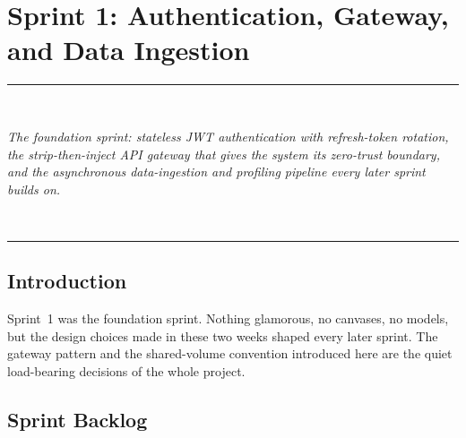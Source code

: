 \documentclass[12pt, a4paper, oneside]{report}
\newcommand{\chapterabstract}[1]{%
  \vspace*{1.2cm}%
  \begin{center}%
  \rule{0.45\textwidth}{0.4pt}\\[0.8em]%
  \begin{minipage}{0.82\textwidth}\centering\itshape\large #1\end{minipage}\\[0.8em]%
  \rule{0.45\textwidth}{0.4pt}%
  \end{center}%
  \vspace*{\fill}\clearpage}
\begin{document}
\chapter{Sprint 1: Authentication, Gateway, and Data Ingestion}
\chapterabstract{The foundation sprint: stateless JWT authentication with
refresh-token rotation, the strip-then-inject API gateway that gives the system
its zero-trust boundary, and the asynchronous data-ingestion and profiling
pipeline every later sprint builds on.}

\section*{Introduction}

Sprint~1 was the foundation sprint. Nothing glamorous, no
canvases, no models, but the design choices made in these two
weeks shaped every later sprint. The gateway pattern and the
shared-volume convention introduced here are the quiet load-bearing
decisions of the whole project.

\section{Sprint Backlog}
\end{document}
